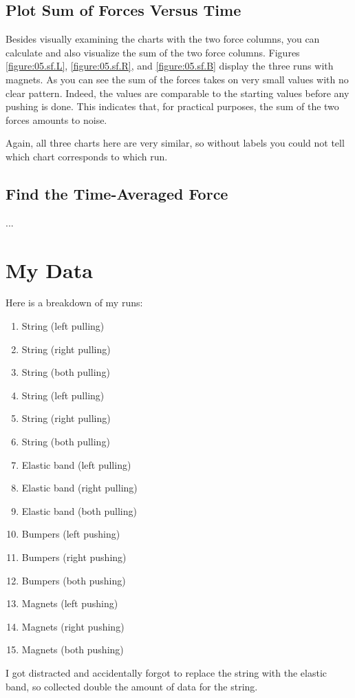\subsection{Plot Sum of Forces Versus Time}
Besides visually examining the charts with the two force columns, you can calculate and also visualize the sum of the two force columns. Figures \ref{figure:05.sf.L}, \ref{figure:05.sf.R}, and \ref{figure:05.sf.B} display the three runs with magnets. As you can see the sum of the forces takes on very small values with no clear pattern. Indeed, the values are comparable to the starting values before any pushing is done. This indicates that, for practical purposes, the sum of the two forces amounts to noise.

Again, all three charts here are very similar, so without labels you could not tell which chart corresponds to which run.
\subsection{Find the Time-Averaged Force}
...
\section{My Data}
Here is a breakdown of my runs:
\begin{enumerate}
    \item String (left pulling)
    \item String (right pulling)
    \item String (both pulling)
    \item String (left pulling)
    \item String (right pulling)
    \item String (both pulling)
    \item Elastic band (left pulling)
    \item Elastic band (right pulling)
    \item Elastic band (both pulling)
    \item Bumpers (left pushing)
    \item Bumpers (right pushing)
    \item Bumpers (both pushing)
    \item Magnets (left pushing)
    \item Magnets (right pushing)
    \item Magnets (both pushing)
\end{enumerate}
I got distracted and accidentally forgot to replace the string with the elastic band, so collected double the amount of data for the string.
